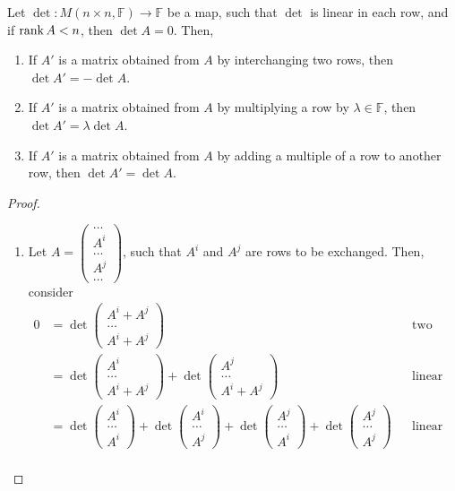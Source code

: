 \documentclass[letterpaper,12pt]{article}
\begin{document}
\begin{theorem}
Let $\det: M(n \times n, \mathbb{F}) \rightarrow \mathbb{F}$ be a map, such that $\det$ is linear in each row, and if $\operatorname{rank}{A} < n$, then $\det{A} = 0$. Then,
\begin{enumerate}
    \item If $A'$ is a matrix obtained from $A$ by interchanging two rows, then $\det{A'} = - \det{A}$.
    \item If $A'$ is a matrix obtained from $A$ by multiplying a row by $\lambda \in \mathbb{F}$, then $\det{A'} = \lambda \det{A}$.
    \item If $A'$ is a matrix obtained from $A$ by adding a multiple of a row to another row, then $\det{A'} = \det{A}$.
\end{enumerate}
\end{theorem}
\begin{proof}
\begin{enumerate}
    \item Let $A = \begin{pmatrix} \dots \\ A^i \\ \dots \\ A^j \\ \dots \end{pmatrix}$, such that $A^i$ and $A^j$ are rows to be exchanged. Then, consider
    \begin{align*}
        0 & = \det{\begin{pmatrix} A^i + A^j \\ \dots \\ A^i + A^j \end{pmatrix}} && \text{two equal rows} \\
        & = \det{\begin{pmatrix} A^i \\ \dots \\ A^i + A^j \end{pmatrix}} + \det{\begin{pmatrix} A^j \\ \dots \\ A^i + A^j \end{pmatrix}} && \text{linear in top row} \\
        & = \det{\begin{pmatrix} A^i \\ \dots \\ A^i \end{pmatrix}} + \det{\begin{pmatrix} A^i \\ \dots \\ A^j \end{pmatrix}} + \det{\begin{pmatrix} A^j \\ \dots \\ A^i \end{pmatrix}} + \det{\begin{pmatrix} A^j \\ \dots \\ A^j \end{pmatrix}} && \text{linear in bottom row} \\

\end{align*}
\end{enumerate}
\end{proof}
\end{document}
